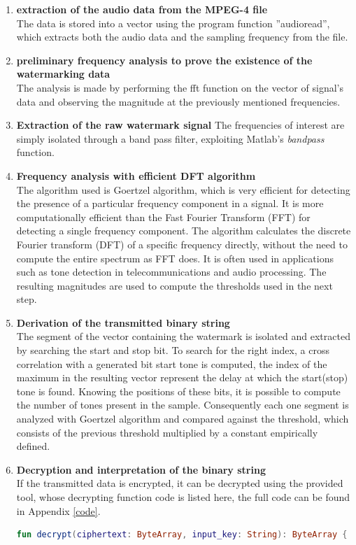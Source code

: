 \begin{enumerate}
    \item \textbf{extraction of the audio data from the MPEG-4 file}\\
    The data is stored into a vector using the program function ''audioread'', which extracts both the audio data and the sampling frequency from the file.
    \item \textbf{preliminary frequency analysis to prove the existence of the watermarking data}\\
    The analysis is made by performing the fft function on the vector of signal's data and observing the magnitude at the previously mentioned frequencies. 
    \item \textbf{Extraction of the raw watermark signal} 
    The frequencies of interest are simply isolated through a band pass filter, exploiting Matlab's \textit{bandpass} function.
    
    \item \textbf{Frequency analysis with efficient DFT algorithm}\\
    The algorithm used is Goertzel algorithm, which is very efficient for detecting the presence of a particular frequency component in a signal. It is more computationally efficient than the Fast Fourier Transform (FFT) for detecting a single frequency component. The algorithm calculates the discrete Fourier transform (DFT) of a specific frequency directly, without the need to compute the entire spectrum as FFT does. It is often used in applications such as tone detection in telecommunications and audio processing. The resulting magnitudes are used to compute the thresholds used in the next step.
    
    \item \textbf{Derivation of the transmitted binary string} \\
    The segment of the vector containing the watermark is isolated and extracted by searching the start and stop bit. To search for the right index, a cross correlation with a generated bit start tone is computed, the index of the maximum in the resulting vector represent the delay at which the start(stop) tone is found. Knowing the positions of these bits, it is possible to compute the number of tones present in the sample. Consequently each one segment is analyzed with Goertzel algorithm and compared against the threshold, which consists of the previous threshold multiplied by a constant empirically defined.
    
    \item \textbf{Decryption and interpretation of the binary string}\\
    If the transmitted data is encrypted, it can be decrypted using the provided tool, whose decrypting function code is listed here, the full code can be found in Appendix \ref{code}.
\begin{lstlisting}[language=Kotlin]
    fun decrypt(ciphertext: ByteArray, input_key: String): ByteArray {


\end{lstlisting}
\end{enumerate}
